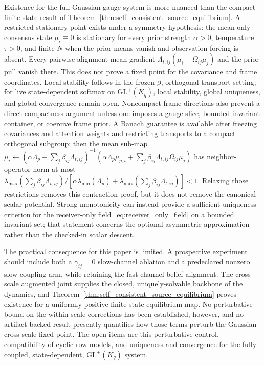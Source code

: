 \documentclass[11pt]{article}
\begin{document}
Existence for the full Gaussian gauge system is more nuanced than the compact finite-state result of Theorem~\ref{thm:self_consistent_source_equilibrium}. A restricted stationary point exists under a symmetry hypothesis: the mean-only consensus state $\mu_i \equiv 0$ is stationary for every prior strength $\alpha>0$, temperature $\tau>0$, and finite $N$ when the prior means vanish and observation forcing is absent. Every pairwise alignment mean-gradient $\Lambda_{t,ij}(\mu_i-\Omega_{ij}\mu_j)$ and the prior pull vanish there. This does not prove a fixed point for the covariance and frame coordinates. Local stability follows in the frozen-$\beta$, orthogonal-transport setting; for live state-dependent softmax on $\mathrm{GL}^+(K_q)$, local stability, global uniqueness, and global convergence remain open. Noncompact frame directions also prevent a direct compactness argument unless one imposes a gauge slice, bounded invariant container, or coercive frame prior. A Banach guarantee is available after freezing covariances and attention weights and restricting transports to a compact orthogonal subgroup: then the mean sub-map $\mu_i\leftarrow(\alpha\Lambda_p+\sum_j\beta_{ij}\Lambda_{t,ij})^{-1}(\alpha\Lambda_p\mu_{p,i}+\sum_j\beta_{ij}\Lambda_{t,ij}\Omega_{ij}\mu_j)$ has neighbor-operator norm at most $\lambda_{\max}(\sum_j\beta_{ij}\Lambda_{t,ij})/[\alpha\lambda_{\min}(\Lambda_p)+\lambda_{\max}(\sum_j\beta_{ij}\Lambda_{t,ij})]<1$. Relaxing those restrictions removes this contraction proof, but it does not remove the canonical scalar potential. Strong monotonicity can instead provide a sufficient uniqueness criterion for the receiver-only field~\eqref{eq:receiver_only_field} on a bounded invariant set; that statement concerns the optional asymmetric approximation rather than the checked-in scalar descent.

The practical consequence for this paper is limited. A prospective experiment should include both a $\gamma_{ij}=0$ slow-channel ablation and a predeclared nonzero slow-coupling arm, while retaining the fast-channel belief alignment. The cross-scale augmented joint supplies the closed, uniquely-solvable backbone of the dynamics, and Theorem~\ref{thm:self_consistent_source_equilibrium} proves existence for a uniformly positive finite-state equilibrium map. No perturbative bound on the within-scale corrections has been established, however, and no artifact-backed result presently quantifies how those terms perturb the Gaussian cross-scale fixed point. The open items are this perturbative control, compatibility of cyclic row models, and uniqueness and convergence for the fully coupled, state-dependent, $\mathrm{GL}^+(K_q)$ system.
\end{document}
